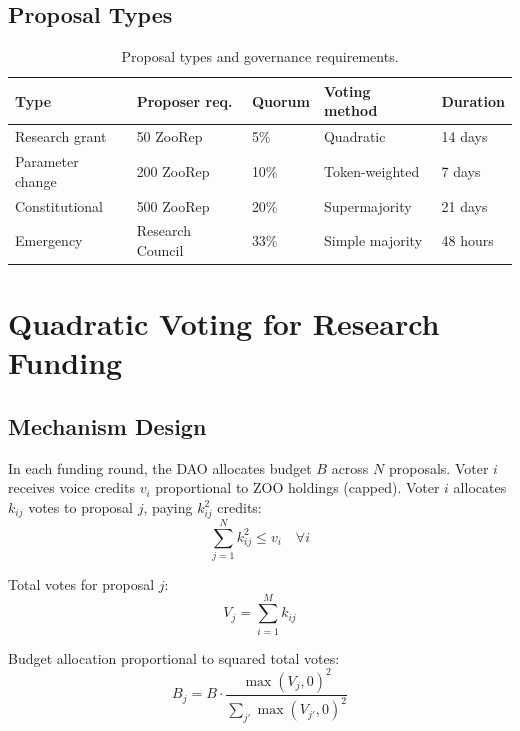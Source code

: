 \documentclass[11pt,a4paper]{article}
\newcommand{\ZOO}{\textsc{ZOO}}
\begin{document}
\subsection{Proposal Types}

\begin{table}[H]
\centering
\caption{Proposal types and governance requirements.}
\label{tab:proposals}
\begin{tabular}{p{3cm}p{2.5cm}p{2cm}p{2.5cm}p{2cm}}
\toprule
\textbf{Type} & \textbf{Proposer req.} & \textbf{Quorum} &
  \textbf{Voting method} & \textbf{Duration} \\
\midrule
Research grant & 50 ZooRep & 5\% & Quadratic & 14 days \\
Parameter change & 200 ZooRep & 10\% & Token-weighted & 7 days \\
Constitutional & 500 ZooRep & 20\% & Supermajority & 21 days \\
Emergency & Research Council & 33\% & Simple majority & 48 hours \\
\bottomrule
\end{tabular}
\end{table}


\section{Quadratic Voting for Research Funding}
\label{sec:qv}

\subsection{Mechanism Design}

In each funding round, the DAO allocates budget $B$ across $N$ proposals.
Voter $i$ receives voice credits $v_i$ proportional to \ZOO{} holdings
(capped). Voter $i$ allocates $k_{ij}$ votes to proposal $j$, paying
$k_{ij}^2$ credits:
\begin{equation}
  \sum_{j=1}^{N} k_{ij}^2 \leq v_i \quad \forall i
\end{equation}

Total votes for proposal $j$:
\begin{equation}
  V_j = \sum_{i=1}^{M} k_{ij}
\end{equation}

Budget allocation proportional to squared total votes:
\begin{equation}
  B_j = B \cdot \frac{\max(V_j, 0)^2}{\sum_{j'} \max(V_{j'}, 0)^2}
\end{equation}
\end{document}
